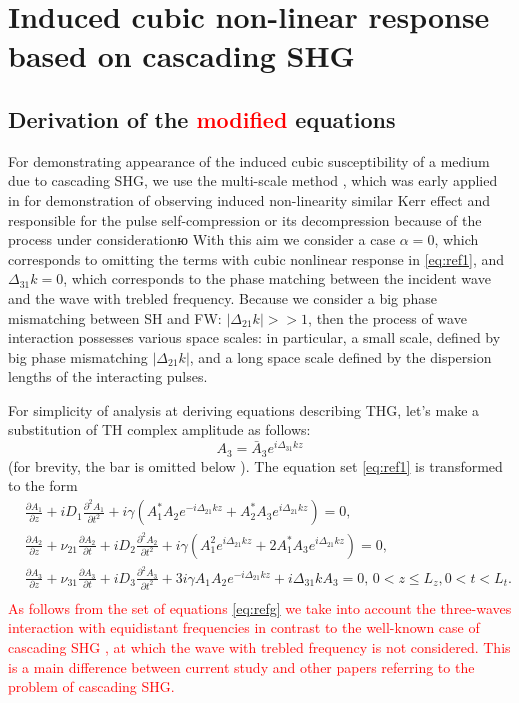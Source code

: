 \documentclass[a4paper, 12pt, onecolumn]{extarticle}
\begin{document}
\section{Induced cubic non-linear response based on cascading SHG}

\subsection{Derivation of the \textcolor{red}{modified } equations}

For demonstrating  appearance of the  induced cubic susceptibility of a medium due to cascading SHG, we use the multi-scale method \cite{bib:n24}, which was early applied in \cite{bib:n19} for demonstration of observing induced non-linearity similar Kerr effect and responsible for the pulse self-compression or its decompression  because of the  process under considerationю
With this aim we consider a case \(\alpha=0\), which corresponds to omitting the terms with cubic nonlinear response in \eqref{eq:ref1},  and \(\Delta_{31}k=0\), which corresponds to the phase matching between the incident wave and the wave with trebled frequency. Because we consider a big phase mismatching between SH and FW: \(|\Delta_{21}k|>>1\), then the process of wave interaction possesses various space scales: in particular, a small scale, defined by big phase mismatching \(|\Delta_{21}k|\), and a long space scale defined by the dispersion lengths of the interacting pulses. 

For simplicity of  analysis at deriving equations describing THG, let's make a substitution of TH complex amplitude as follows:
$$
{A}_3=\bar{A}_3e^{i\Delta_{31}kz}
$$
(for brevity, the bar is omitted below ). The equation set \eqref{eq:ref1} is transformed to the form
\begin{equation}
\label{eq:refg}
\begin{aligned}
&\frac{\partial{A_1}}{\partial{z}}+iD_1\frac{\partial^2{A_1}}{\partial{t^2}}+i\gamma\left(A_1^* A_2e^{-i\Delta_{21} kz}+A_2^* A_3e^{i\Delta_{21}kz}\right)=0,\\
&\frac{\partial{A_2}}{\partial{z}}+\nu_{21}\frac{\partial A_2}{\partial t}+iD_2\frac{\partial^2{A_2}}{\partial{t^2}}+i\gamma\left(A_1^2e^{i\Delta_{21} kz}+2A_1^*A_3e^{i\Delta_{21}kz}\right)=0,\\
&\frac{\partial{A_3}}{\partial{z}}+\nu_{31}\frac{\partial A_3}{\partial t}+iD_3\frac{\partial^2{A_3}}{\partial{t^2}}+3i\gamma A_1 A_2e^{-i\Delta_{21}kz}+i\Delta_{31}kA_3=0,\,0< z \leq L_z , 0<t<L_t.\\
\end{aligned}\end{equation}
\textcolor{red}{As follows from the set of equations \eqref{eq:refg} we take into account the three-waves interaction with equidistant frequencies in contrast to the well-known case of cascading SHG , at which the wave with trebled frequency is not considered. This is a main difference between current study and other papers referring to the problem of cascading SHG. }
\end{document}

